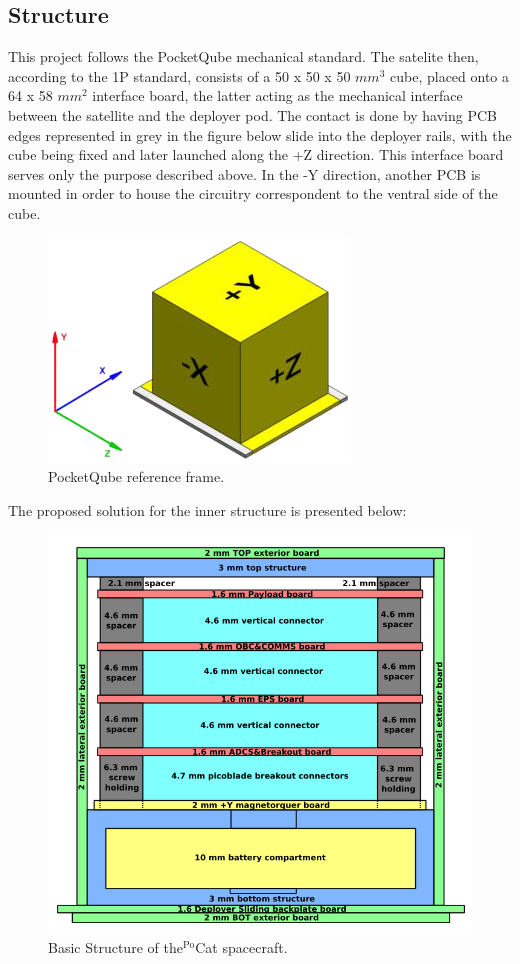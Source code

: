 \subsection{Structure}

This project follows the PocketQube mechanical standard.
The satelite then, according to the 1P standard, consists of a 50 x 50 x 50 $mm^3$ cube,
placed onto a 64 x 58 $mm^2$ interface board, the latter acting as the mechanical 
interface between the satellite and the deployer pod. The contact is done by
having PCB edges represented in grey in the figure below slide into the
deployer rails, with the cube being fixed and later launched along the +Z 
direction. This interface board serves only the purpose described 
above. In the -Y direction, another PCB is mounted in order to house the 
circuitry correspondent to the ventral side of the cube.

\begin{figure}[H]
    \centering
    \includegraphics[width=0.4\linewidth]{res/img/1_introduction/Pqaxis.png}
    \caption{PocketQube reference frame.}
    \label{fig:pqaxis}
\end{figure}

The proposed solution for the inner structure is presented below:

\begin{figure}[H]
    \centering
    \includegraphics[width=0.4\linewidth]{res/img/1_introduction/2-GeneralStructure.png}
    \caption{Basic Structure of  the$^{\text{Po}}$Cat spacecraft.}
    \label{fig:genstruc}
\end{figure}

